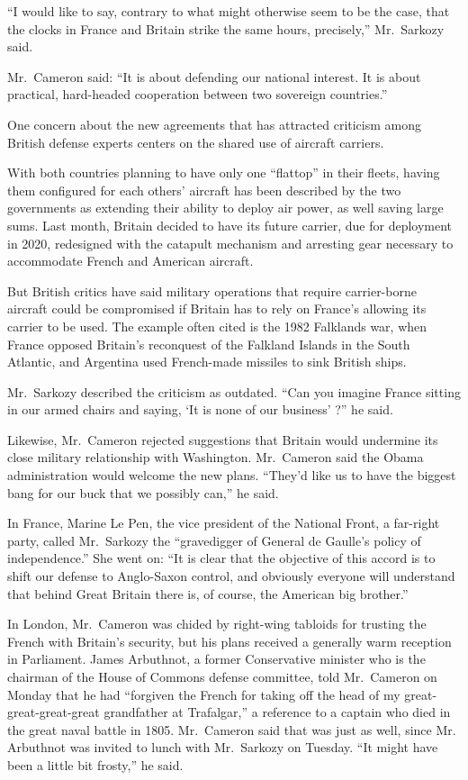﻿\documentclass[12pt]{article}
\begin{document}
``I would like to say, contrary to what might otherwise seem to be the case, that the clocks in
France and Britain strike the same hours, precisely,'' Mr.~Sarkozy said.

Mr.~Cameron said: ``It is about defending our national interest. It is about practical, hard-headed
cooperation between two sovereign countries.''

One concern about the new agreements that has attracted criticism among British defense experts
centers on the shared use of aircraft carriers.

With both countries planning to have only one ``flattop'' in their fleets, having them configured
for each others' aircraft has been described by the two governments as extending their ability to
deploy air power, as well saving large sums. Last month, Britain decided to have its future carrier,
due for deployment in 2020, redesigned with the catapult mechanism and arresting gear necessary to
accommodate French and American aircraft.

But British critics have said military operations that require carrier-borne aircraft could be
compromised if Britain has to rely on France's allowing its carrier to be used. The example often
cited is the 1982 Falklands war, when France opposed Britain's reconquest of the Falkland Islands in
the South Atlantic, and Argentina used French-made missiles to sink British ships.

Mr.~Sarkozy described the criticism as outdated. ``Can you imagine France sitting in our armed
chairs and saying, `It is none of our business' ?'' he said.

Likewise, Mr.~Cameron rejected suggestions that Britain would undermine its close military
relationship with Washington. Mr.~Cameron said the Obama administration would welcome the new plans.
``They'd like us to have the biggest bang for our buck that we possibly can,'' he said.

In France, Marine Le Pen, the vice president of the National Front, a far-right party, called
Mr.~Sarkozy the ``gravedigger of General de Gaulle's policy of independence.'' She went on: ``It is
clear that the objective of this accord is to shift our defense to Anglo-Saxon control, and
obviously everyone will understand that behind Great Britain there is, of course, the American big
brother.''

In London, Mr.~Cameron was chided by right-wing tabloids for trusting the French with Britain's
security, but his plans received a generally warm reception in Parliament. James Arbuthnot, a former
Conservative minister who is the chairman of the House of Commons defense committee, told
Mr.~Cameron on Monday that he had ``forgiven the French for taking off the head of my
great-great-great-great grandfather at Trafalgar,'' a reference to a captain who died in the great
naval battle in 1805. Mr.~Cameron said that was just as well, since Mr. Arbuthnot was invited to
lunch with Mr.~Sarkozy on Tuesday. ``It might have been a little bit frosty,'' he said.
\end{document}
